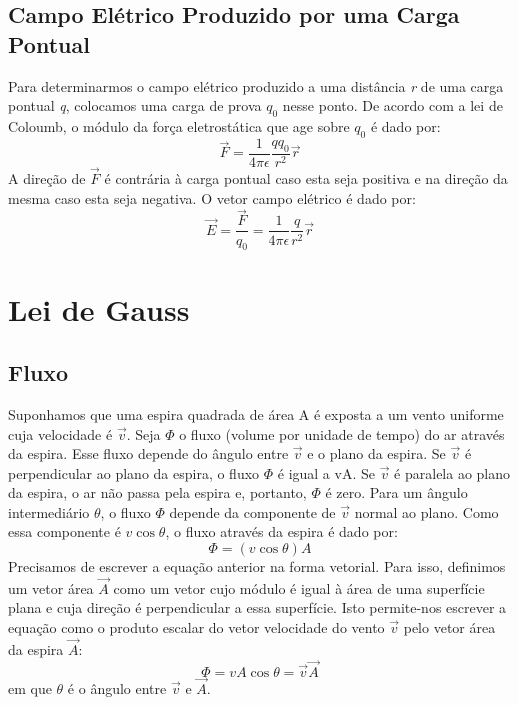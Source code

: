 \documentclass{article}
\begin{document}
\subsection{Campo Elétrico Produzido por uma Carga Pontual}
Para determinarmos o campo elétrico produzido a uma distância \textit{r} de uma carga pontual \textit{q}, colocamos uma carga de prova \textit{$q_0$} nesse ponto. De acordo com a lei de Coloumb, o módulo da força eletrostática que age sobre \textit{$q_0$} é dado por:
\newline
\[\vec{F} = \frac{1}{4\pi\epsilon} \frac{{q}{q_0}}{r^2} \vec{r}\]
\newline
A direção de \(\vec{F}\) é contrária à carga pontual caso esta seja positiva e na direção da mesma caso esta seja negativa. O vetor campo elétrico é dado por:
\newline
\[\vec{E} = \frac{\vec{F}}{q_0} = \frac{1}{4\pi\epsilon} \frac{q}{r^2} \vec{r}\]
\section{Lei de Gauss}
\subsection{Fluxo}
Suponhamos que uma espira quadrada de área A é exposta a um vento uniforme cuja velocidade é \(\vec{v}\). Seja \(\Phi\) o fluxo (volume por unidade de tempo) do ar através da espira. Esse fluxo depende do ângulo entre \(\vec{v}\) e o plano da espira. Se \(\vec{v}\) é perpendicular ao plano da espira, o fluxo \(\Phi\) é igual a vA.
Se \(\vec{v}\) é paralela ao plano da espira, o ar não passa pela espira e, portanto, \(\Phi\) é zero. Para um ângulo intermediário \(\theta\), o fluxo \(\Phi\) depende da componente de \(\vec{v}\) normal ao plano. Como essa componente é \(v \cos \theta\), o fluxo através da espira é dado por:
\newline
\[\Phi = (v \cos \theta) A\]
\newline
Precisamos de escrever a equação anterior na forma vetorial. Para isso, definimos um vetor área \(\vec{A}\) como um vetor cujo módulo é igual à área de uma superfície plana e cuja direção é perpendicular a essa superfície. Isto permite-nos escrever a equação como o produto escalar do vetor velocidade do vento \(\vec{v}\) pelo vetor área da espira \(\vec{A}\):
\newline
\[\Phi = v A \cos \theta = \vec{v} \vec{A}\]
\newline
em que \(\theta\) é o ângulo entre \(\vec{v}\) e \(\vec{A}\).
\end{document}
